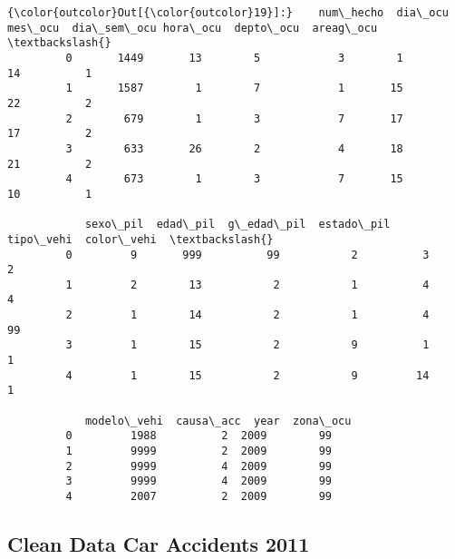 \documentclass[11pt]{article}
\begin{document}
\begin{Verbatim}[commandchars=\\\{\}]
{\color{outcolor}Out[{\color{outcolor}19}]:}    num\_hecho  dia\_ocu  mes\_ocu  dia\_sem\_ocu hora\_ocu  depto\_ocu  areag\_ocu  \textbackslash{}
         0       1449       13        5            3        1         14          1   
         1       1587        1        7            1       15         22          2   
         2        679        1        3            7       17         17          2   
         3        633       26        2            4       18         21          2   
         4        673        1        3            7       15         10          1   
         
            sexo\_pil  edad\_pil  g\_edad\_pil  estado\_pil  tipo\_vehi  color\_vehi  \textbackslash{}
         0         9       999          99           2          3           2   
         1         2        13           2           1          4           4   
         2         1        14           2           1          4          99   
         3         1        15           2           9          1           1   
         4         1        15           2           9         14           1   
         
            modelo\_vehi  causa\_acc  year  zona\_ocu  
         0         1988          2  2009        99  
         1         9999          2  2009        99  
         2         9999          4  2009        99  
         3         9999          4  2009        99  
         4         2007          2  2009        99  
\end{Verbatim}
            
    \hypertarget{clean-data-car-accidents-2011}{%
\subsection{Clean Data Car Accidents
2011}\label{clean-data-car-accidents-2011}}
\end{document}
